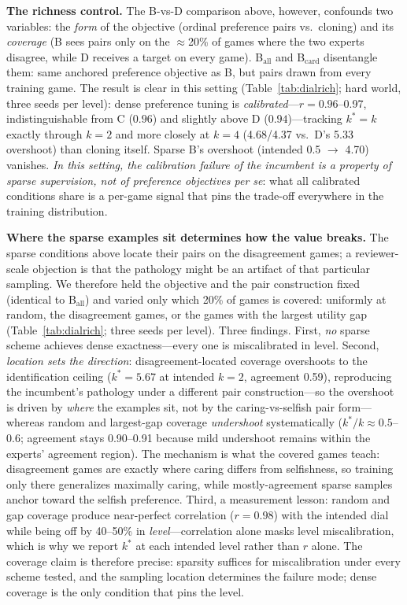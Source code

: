 \documentclass[manuscript, screen, review]{jair}
\begin{document}
\textbf{The richness control.} The B-vs-D comparison above, however, confounds two variables:
the \emph{form} of the objective (ordinal preference pairs vs.\ cloning) and its \emph{coverage}
(B sees pairs only on the $\approx$20\% of games where the two experts disagree, while D receives
a target on every game). B$_{\mathrm{all}}$ and B$_{\mathrm{card}}$ disentangle them: same
anchored preference objective as B, but pairs drawn from every training game. The result is
clear in this setting (Table~\ref{tab:dialrich}; hard world, three seeds per level): dense preference
tuning is \emph{calibrated}---$r{=}0.96$--0.97, indistinguishable from C ($0.96$) and slightly
above D ($0.94$)---tracking $k^*{=}k$ exactly through $k{=}2$ and more closely at $k{=}4$
(4.68/4.37 vs.\ D's 5.33 overshoot) than cloning itself. Sparse B's overshoot (intended 0.5
$\to$ 4.70) vanishes. \emph{In this setting, the calibration failure of the incumbent is a property of sparse
supervision, not of preference objectives per se}: what all calibrated conditions share is a
per-game signal that pins the trade-off everywhere in the training distribution.

\textbf{Where the sparse examples sit determines how the value breaks.} The sparse conditions above locate their pairs on the disagreement games; a reviewer-scale objection is that the pathology might be an artifact of that particular sampling. We therefore held the objective and the pair construction fixed (identical to B$_{\mathrm{all}}$) and varied only which 20\% of games is covered: uniformly at random, the disagreement games, or the games with the largest utility gap (Table~\ref{tab:dialrich}; three seeds per level). Three findings. First, \emph{no} sparse scheme achieves dense exactness---every one is miscalibrated in level. Second, \emph{location sets the direction}: disagreement-located coverage overshoots to the identification ceiling ($k^*{=}5.67$ at intended $k{=}2$, agreement 0.59), reproducing the incumbent's pathology under a different pair construction---so the overshoot is driven by \emph{where} the examples sit, not by the caring-vs-selfish pair form---whereas random and largest-gap coverage \emph{undershoot} systematically ($k^{*}/k \approx 0.5$--$0.6$; agreement stays 0.90--0.91 because mild undershoot remains within the experts' agreement region). The mechanism is what the covered games teach: disagreement games are exactly where caring differs from selfishness, so training only there generalizes maximally caring, while mostly-agreement sparse samples anchor toward the selfish preference. Third, a measurement lesson: random and gap coverage produce near-perfect correlation ($r{=}0.98$) with the intended dial while being off by 40--50\% in \emph{level}---correlation alone masks level miscalibration, which is why we report $k^*$ at each intended level rather than $r$ alone. The coverage claim is therefore precise: sparsity suffices for miscalibration under every scheme tested, and the sampling location determines the failure mode; dense coverage is the only condition that pins the level.
\end{document}
